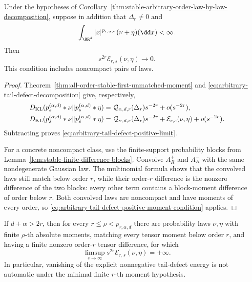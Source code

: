 \begin{corollary}
\label{cor:arbitrary-tail-defect-positive-moment-condition}
Under the hypotheses of
Corollary~\ref{thm:stable-arbitrary-order-law-by-law-decomposition}, suppose in
addition that \(\Delta_r\ne0\) and
\begin{equation}\label{eq:arbitrary-tail-defect-positive-moment-condition}
 \int_{\RR^d}|x|^{p_{r,\alpha,d}}(\nu+\eta)(\dd x)<\infty.
\end{equation}
Then
\begin{equation}\label{eq:arbitrary-tail-defect-positive-limit}
 s^{2r}\mathcal E_{r,s}(\nu,\eta)\longrightarrow0.
\end{equation}
This condition includes noncompact pairs of laws.
\end{corollary}

\begin{proof}
Theorem~\ref{thm:all-order-stable-first-unmatched-moment} and
\eqref{eq:arbitrary-tail-defect-decomposition} give, respectively,
\begin{align*}
 D_{\rm KL}(p_s^{(\alpha,d)}*\nu\|p_s^{(\alpha,d)}*\eta)
 &=\mathcal Q_{\alpha,d,r}(\Delta_r)s^{-2r}+o(s^{-2r}),\\
 D_{\rm KL}(p_s^{(\alpha,d)}*\nu\|p_s^{(\alpha,d)}*\eta)
 &=\mathcal Q_{\alpha,d,r}(\Delta_r)s^{-2r}
   +\mathcal E_{r,s}(\nu,\eta)+o(s^{-2r}).
\end{align*}
Subtracting proves \eqref{eq:arbitrary-tail-defect-positive-limit}.

For a concrete noncompact class, use the finite-support probability blocks
from Lemma~\ref{lem:stable-finite-difference-blocks}.  Convolve \(A_R^+\) and
\(A_R^-\) with the same nondegenerate Gaussian law.  The multinomial formula
shows that the convolved laws still match below order \(r\), while their
order-\(r\) difference is the nonzero difference of the two blocks: every
other term contains a block-moment difference of order below \(r\).  Both
convolved laws are noncompact and have moments of every order, so
\eqref{eq:arbitrary-tail-defect-positive-moment-condition} applies.
\end{proof}

\begin{corollary}
\label{cor:arbitrary-tail-defect-nonvacuousness}
If \(d+\alpha>2r\), then for every
\(r\le\rho<p_{r,\alpha,d}\) there are probability laws \(\nu,\eta\) with
finite \(\rho\)-th absolute moments, matching every tensor moment below
order \(r\), and having a finite nonzero order-\(r\) tensor difference, for
which
\begin{equation}\label{eq:arbitrary-tail-defect-unbounded-limsup}
 \limsup_{s\to\infty}s^{2r}\mathcal E_{r,s}(\nu,\eta)=+\infty.
\end{equation}
In particular, vanishing of the explicit nonnegative tail-defect energy is
not automatic under the minimal finite \(r\)-th moment hypothesis.
\end{corollary}

